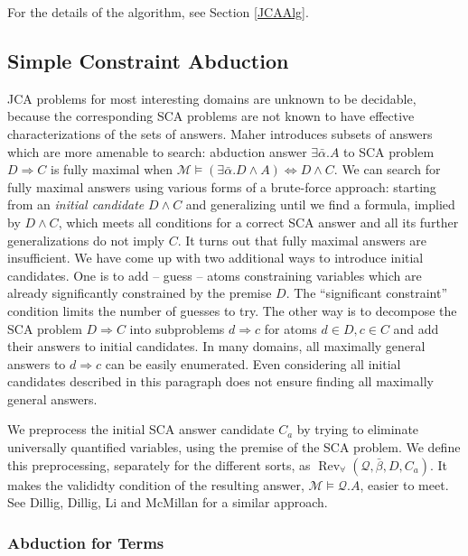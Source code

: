 \documentclass{article}
\newcommand{\tmem}[1]{{\em #1\/}}
\newcommand{\tmop}[1]{\ensuremath{\operatorname{#1}}}
\begin{document}
For the details of the algorithm, see Section \ref{JCAAlg}.

\subsection{Simple Constraint Abduction}

JCA problems for most interesting domains are unknown to be decidable, because
the corresponding SCA problems are not known to have effective
characterizations of the sets of answers. Maher {\cite{AbductionMaher}}
introduces subsets of answers which are more amenable to search: abduction
answer $\exists \bar{\alpha} .A$ to SCA problem $D \Rightarrow C$ is fully
maximal when $\mathcal{M} \vDash (\exists \bar{\alpha} .D \wedge A)
\Leftrightarrow D \wedge C$. We can search for fully maximal answers using
various forms of a brute-force approach: starting from an {\tmem{initial
candidate}} $D \wedge C$ and generalizing until we find a formula, implied by
$D \wedge C$, which meets all conditions for a correct SCA answer and all its
further generalizations do not imply $C$. It turns out that fully maximal
answers are insufficient. We have come up with two additional ways to
introduce initial candidates. One is to add -- guess -- atoms constraining
variables which are already significantly constrained by the premise $D$. The
``significant constraint'' condition limits the number of guesses to try. The
other way is to decompose the SCA problem $D \Rightarrow C$ into subproblems
$d \Rightarrow c$ for atoms $d \in D, c \in C$ and add their answers to
initial candidates. In many domains, all maximally general answers to $d
\Rightarrow c$ can be easily enumerated. Even considering all initial
candidates described in this paragraph does not ensure finding all maximally
general answers.

We preprocess the initial SCA answer candidate $C_a$ by trying to eliminate
universally quantified variables, using the premise of the SCA problem. We
define this preprocessing, separately for the different sorts, as
$\tmop{Rev}_{\forall} (\mathcal{Q}, \bar{\beta}, D, C_a)$. It makes the
valididty condition of the resulting answer, $\mathcal{M} \vDash
\mathcal{Q}.A$, easier to meet. See Dillig, Dillig, Li and McMillan
{\cite{InductLoopInv}} for a similar approach.

\subsubsection{Abduction for Terms}\label{SCATermsMain}
\end{document}
